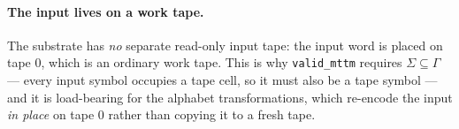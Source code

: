 \paragraph{The input lives on a work tape.}  The substrate has
\emph{no} separate read-only input tape: the input word is placed on
tape $0$, which is an ordinary work tape.  This is why
\texttt{valid\_mttm} requires $\Sigma \subseteq \Gamma$ --- every input
symbol occupies a tape cell, so it must also be a tape symbol --- and it
is load-bearing for the alphabet transformations, which re-encode the
input \emph{in place} on tape $0$ rather than copying it to a fresh
tape.
\endinput
